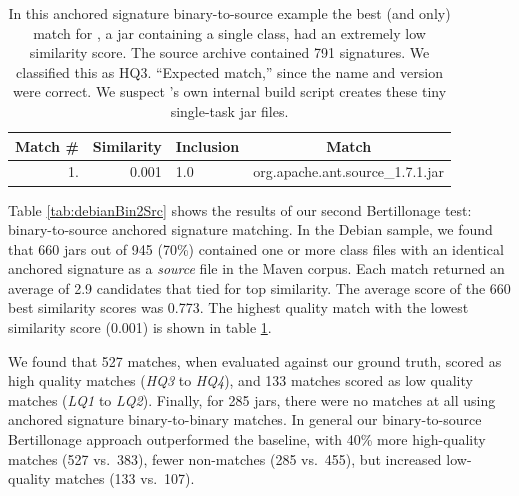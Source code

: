 \begin{table}[h]
  \centering
\begin{tabular}[htbp]{r|r|l|l}
\textbf{Match \#}  & \textbf{Similarity} & \textbf{Inclusion} & \multicolumn{1}{c}{\textbf{Match}} \\
\hline
1.        & 0.001 & 1.0   &         org.apache.ant.source\_1.7.1.jar \\
\end{tabular}
  \caption{
    In this anchored signature binary-to-source example the best (and only)
    match for , a jar containing a single
    class, had an extremely low similarity score.  The source archive
    contained 791 signatures.  We classified this as HQ3. ``Expected
    match,'' since the name and version were correct.  We suspect
    's own internal build script creates these tiny single-task
    jar files.
}
  \label{tab:001similarity}
\end{table}


Table \ref{tab:debianBin2Src} shows the results of our second Bertillonage
test:  binary-to-source anchored signature matching.  In the Debian sample,
we found that 660 jars out of 945 (70\%) contained one or more class files
with an identical anchored signature as a \emph{source} file in the Maven
corpus.  Each match returned an average of 2.9 candidates that tied for top
similarity.  The average score of the 660 best similarity scores was
0.773.  The highest quality match with the lowest similarity score (0.001)
is shown in table \ref{tab:001similarity}.

We found that 527 matches, when evaluated against our ground truth, scored
as high quality matches (\emph{HQ3} to \emph{HQ4}), and 133 matches scored
as low quality matches (\emph{LQ1} to \emph{LQ2}).  Finally, for 285 jars,
there were no matches at all using anchored signature binary-to-binary
matches.  In general our binary-to-source Bertillonage approach
outperformed the baseline, with 40\% more high-quality matches (527 vs.\
383), fewer non-matches (285 vs.\ 455), but increased low-quality matches
(133 vs.\ 107).



